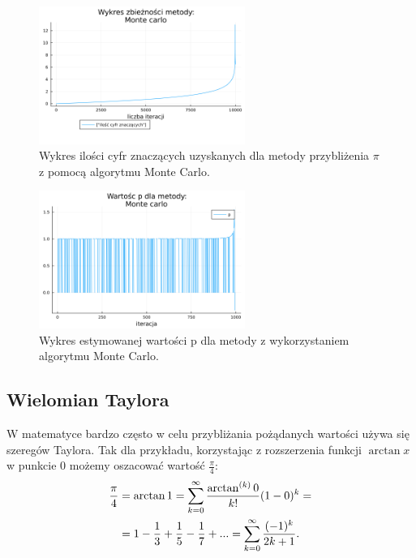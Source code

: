 \begin{figure}[!h]\centering
\renewcommand{\figurename}{Wykres}
\includegraphics[width=0.6\textwidth]{../prog/monte_carlo_log_error.png}
\caption{Wykres ilości cyfr znaczących uzyskanych dla metody przybliżenia $\pi$ z pomocą algorytmu Monte Carlo.}
\label{monte-carlo-error}
\end{figure}

\begin{figure}[!h]\centering
    \renewcommand{\figurename}{Wykres}
    \includegraphics[width=0.6\textwidth]{../prog/monte_carlo_error_ratio.png}
    \caption{Wykres estymowanej wartości p dla metody z wykorzystaniem algorytmu Monte Carlo.}
    \label{monte-carlo-convergence}
\end{figure}


\subsection{Wielomian Taylora}
W matematyce bardzo często w celu przybliżania pożądanych wartości używa się szeregów Taylora. Tak dla przykładu, korzystając z rozszerzenia funkcji $\arctan x$ w punkcie $0$ możemy oszacować wartość $\frac\pi4$:
\begin{equation}
\begin{split}
    \frac\pi4&=\arctan1=\sum\limits_{k=0}^\infty{\arctan^{(k)}0\over k!}(1-0)^k=\\
    &=1-\frac13+\frac15-\frac17+...=\sum\limits_{k=0}^\infty{(-1)^k\over 2k+1}.
\end{split}
\end{equation}

